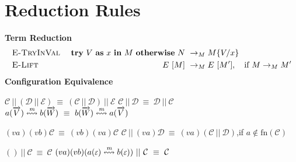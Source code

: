 \documentclass[a4paper,11pt]{article}
\newcommand{\fn}{\text{fn}}
\newcommand{\mbf}[1]{\mathbf{#1}}
\newcommand{\tryin}[4]{\mbf{try}~#1~\mbf{as}~#2~\mbf{in}~#3~\mbf{otherwise}~#4}
\newcommand{\mcal}[1]{\mathcal{#1}}
\newcommand{\eq}{\equiv}
\newcommand{\C}{\mcal{C}}
\newcommand{\D}{\mcal{D}}
\newcommand{\E}{\mcal{E}}
\newcommand{\m}{\textit{\text{m}}}
\newcommand{\run}[2]{#1~[#2]}
\newcommand{\toparrow}[1]{\overrightarrow{#1}}
\newcommand{\vv}{\toparrow{V}}
\newcommand{\ww}{\toparrow{W}}
\newcommand{\buf}[5]{#1(#2) \overset{#3}{\leftrightsquigarrow} #4(#5)}
\newcommand{\empt}{\scalerel*{\mcal{E}}{\epsilon}}
\newcommand{\rrule}[1]{\textsc{\text{#1}}}
\theoremstyle{plain}
\theoremstyle{nonumberplain}
\begin{document}
\section{Reduction Rules}

\textbf{Term Reduction} \hfill {}
\begin{align*}
  & \rrule{E-TryInVal} &~ \tryin{V}{x}{M}{N} &~ \rightarrow_M M\{V/x\} \\
  & \rrule{E-Lift}     &~ \run{E}{M}         &~ \rightarrow_M \run{E}{M'}, \quad \text{if}~M \rightarrow_M M'
\end{align*}
\textbf{Configuration Equivalence} \hfill \fbox{$\C~\eq~\D$}

\begin{center}
$\C~||~(\D~||~\E)~\eq~(\C~||~\D)~||~\E$
\hfill
$\C~||~\D~\eq~\D~||~\C$
\hfill
$\buf{a}{\vv}{\m}{b}{\ww}~\eq~\buf{b}{\ww}{\m}{a}{\vv}$
\end{center}

\begin{center}
$(va)(vb)\C~\eq~(vb)(va)\C$
\hfill
$\C~||~(va)\D~\eq~(va)(\C~||~\D)$,\quad if $a \not\in \fn(\C)$
\end{center}

\begin{center}
$()~||~\C~\eq~\C$
\hfill
$(va)(vb)(\buf{a}{\empt}{\m}{b}{\empt})~||~\C~\eq~\C$
\end{center}
\end{document}
